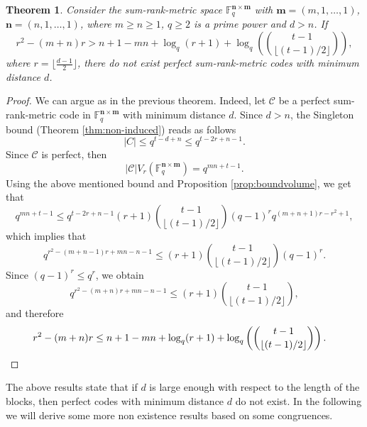 \documentclass[a4paper]{article}
\newtheorem{theorem}[formula]{Theorem}
\newcommand{\F}{\mathbb{F}}
\newcommand{\Fq}{\F_q}
\newcommand{\C}{\mathcal{C}}
\newcommand{\bfn}{\mathbf {n}}
\newcommand{\bfm}{\mathbf {m}}
\newcommand{\spac}{\F^{\bfn\times\bfm}_q}
\begin{document}
\begin{theorem}
    Consider the sum-rank-metric space $\spac$ with $\bfm=(m,1,\dots,1)$, $\bfn=(n,1,\dots,1)$, where $m\geq n\geq1$, $q\geq 2$ is a prime power and $d> n$.
    If 
    \[ r^2-(m+n)r > n+1-mn + \log_q(r+1)+\log_q\left( {t-1 \choose \lfloor (t-1)/2\rfloor}\right), \]
    where $r=\lfloor \frac{d-1}2\rfloor$, there do not exist perfect sum-rank-metric codes with minimum distance $d$.
\end{theorem}
\begin{proof}
    We can argue as in the previous theorem. 
    Indeed, let $\C$ be a perfect sum-rank-metric code in $\spac$ with minimum distance $d$.
    Since $d>n$, the Singleton bound (Theorem \ref{thm:non-induced}) reads as follows
    \[ |C|\leq q^{t-d+n}\leq q^{t-2r+n-1}. \]
    Since $\C$ is perfect, then 
    \[ |\mathcal{C}|V_r(\Fq^{\bfn\times\bfm})=q^{mn+t-1}.  \]
    Using the above mentioned bound and Proposition \ref{prop:boundvolume}, we get that 
    \[ q^{mn+t-1}\leq q^{t-2r+n-1}(r+1) {t-1 \choose \lfloor (t-1)/2\rfloor} (q-1)^r q^{(m+n+1)r-r^2+1}, \]
    which implies that
    \[
    q^{r^2-(m+n-1)r+mn-n-1}\leq (r+1) {t-1 \choose \lfloor (t-1)/2\rfloor}(q-1)^r.
    \]
    Since $(q-1)^r\leq q^r$, we obtain
    \[
    q^{r^2-(m+n)r+mn-n-1}\leq (r+1) {t-1 \choose \lfloor (t-1)/2\rfloor},
    \]
    and therefore
    \begin{align*} 
    &r^2-(m+n)r \leq n+1-mn + \log_q(r+1)+\log_q\left( {t-1 \choose \lfloor (t-1)/2\rfloor}\right). 
  \qedhere  \end{align*}
\end{proof}





The above results state that if $d$ is large enough with respect to the length of the blocks, then perfect codes with minimum distance $d$ do not exist.
In the following we will derive some more non existence results based on some congruences.
\end{document}
